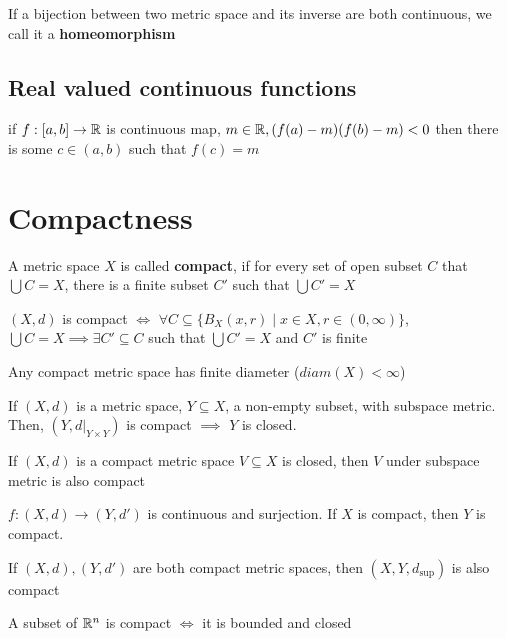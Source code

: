 \begin{definition}
  If a bijection between two metric space and its inverse are
both continuous, we call it a \textbf{homeomorphism}
\end{definition}

\subsection{Real valued continuous functions}

\begin{theorem}
  if $f: [a, b] \to \mathbb R$ is continuous map,
  $m \in \mathbb R, (f(a) - m)(f(b) - m) < 0$ then there is some 
  $c \in (a, b)$ such that $f(c) = m$
\end{theorem}

\section{Compactness}

\begin{definition}
  A metric space $X$ is called \textbf{compact}, if for every set of open subset 
  $C$ that $\bigcup C = X$, there is a finite subset $C'$ such that $\bigcup C' = X$
\end{definition}

\begin{theorem}
  $(X, d)$ is compact $\iff$ $\forall C \subseteq \{B_X(x, r) \mid x \in X, r \in (0, \infty)\}$, 
  $\bigcup C = X \implies \exists C' \subseteq C$ such that $\bigcup C' = X$ and $C'$ is finite
\end{theorem}

\begin{theorem}
  Any compact metric space has finite diameter ($diam(X) < \infty$)
\end{theorem}

\begin{theorem}
  If $(X, d)$ is a metric space, $Y \subseteq X$, a non-empty subset, with subspace metric. Then, 
  $(Y, d|_{Y \times Y})$ is compact $\implies$ $Y$ is closed.
\end{theorem}

\begin{theorem}
  If $(X, d)$ is a compact metric space $V \subseteq X$ is closed, then $V$ under subspace metric is also compact
\end{theorem}

\begin{theorem}
  $f: (X, d) \to (Y, d')$ is continuous and surjection. 
  If $X$ is compact, then $Y$ is compact.
\end{theorem}

\begin{theorem}
  If $(X, d), (Y, d')$ are both compact metric spaces, then $(X, Y, d_{\sup})$ is also compact
\end{theorem}

\begin{theorem}
  A subset of $\mathbb R^n$ is compact $\iff$ it is bounded and closed
\end{theorem}
